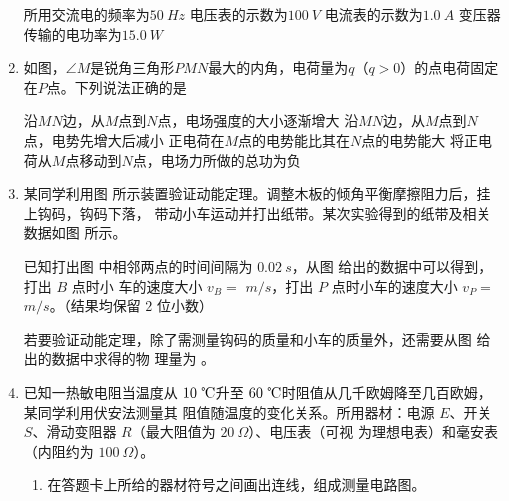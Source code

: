 \begin{enumerate}
\fourchoices
{所用交流电的频率为$ 50 \ Hz $}
{电压表的示数为$ 100 \ V $}
{电流表的示数为$ 1.0 \ A $}
{变压器传输的电功率为$ 15.0 \ W $}




\item
如图，$ \angle M $是锐角三角形$ PMN $最大的内角，电荷量为$ q $（$ q>0 $）的点电荷固定在$ P $点。下列说法正确的是  
\begin{figure}[h!]
\centering

\end{figure}


\fourchoices
{沿$ MN $边，从$ M $点到$ N $点，电场强度的大小逐渐增大}
{沿$ MN $边，从$ M $点到$ N $点，电势先增大后减小}
{正电荷在$ M $点的电势能比其在$ N $点的电势能大}
{将正电荷从$ M $点移动到$ N $点，电场力所做的总功为负}





\gaokaosy

\item
某同学利用图  所示装置验证动能定理。调整木板的倾角平衡摩擦阻力后，挂上钩码，钩码下落，
带动小车运动并打出纸带。某次实验得到的纸带及相关数据如图  所示。
\begin{figure}[h!]
\centering
\begin{subfigure}{0.4\linewidth}
\centering
 
\caption{}\label{2020:全国3:9a}
\end{subfigure}
\hfil
\begin{subfigure}{0.53\linewidth}
\centering
 
\caption{}\label{2020:全国3:9b}
\end{subfigure}
\end{figure}

已知打出图  中相邻两点的时间间隔为 $ 0.02 \ s $，从图  给出的数据中可以得到，打出 $ B $ 点时小
车的速度大小 $ v_{B} =$ \underlinegap $m/s $，打出 $ P $ 点时小车的速度大小 $ v_{P}=$ \underlinegap $m/s $。（结果均保留 $ 2 $ 位小数）

若要验证动能定理，除了需测量钩码的质量和小车的质量外，还需要从图  给出的数据中求得的物
理量为 \underlinegap 。








\newpage
\item 
已知一热敏电阻当温度从 $ 10 \ \celsius $升至 $ 60 \ \celsius $时阻值从几千欧姆降至几百欧姆，某同学利用伏安法测量其
阻值随温度的变化关系。所用器材：电源 $ E $、开关 $ S $、滑动变阻器 $ R $（最大阻值为 $ 20 \ \Omega $）、电压表（可视
为理想电表）和毫安表（内阻约为 $ 100 \ \Omega $）。
\begin{enumerate}
\item
在答题卡上所给的器材符号之间画出连线，组成测量电路图。
\begin{figure}[h!]
\centering

\end{figure}


\end{enumerate}
\end{enumerate}
